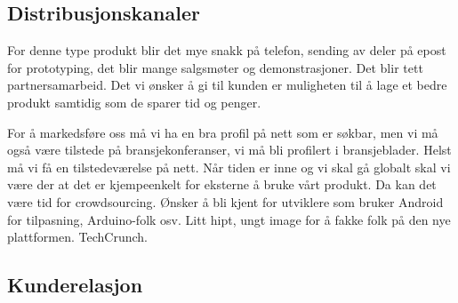 




\subsection{Distribusjonskanaler}

For denne type produkt blir det mye snakk på telefon, sending av deler på epost
for prototyping, det blir mange salgsmøter og demonstrasjoner. Det blir tett
partnersamarbeid. Det vi ønsker å gi til kunden er muligheten til å lage et
bedre produkt samtidig som de sparer tid og penger.

For å markedsføre oss må vi ha en bra profil på nett som er søkbar, men vi må
også være tilstede på bransjekonferanser, vi må bli profilert i bransjeblader.
Helst må vi få en tilstedeværelse på nett. Når tiden er inne og vi skal gå
globalt skal vi være der at det er kjempeenkelt for eksterne å bruke vårt
produkt. Da kan det være tid for crowdsourcing. Ønsker å bli kjent for
utviklere som bruker Android for tilpasning, Arduino-folk osv. Litt hipt, ungt
image for å fakke folk på den nye plattformen. TechCrunch.

\subsection{Kunderelasjon}

